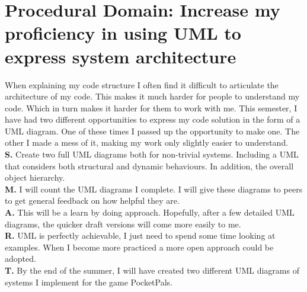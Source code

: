 \documentclass{scrartcl}
\begin{document}
\section{Procedural Domain: Increase my proficiency in using UML to express system architecture}
When explaining my code structure I often find it difficult to articulate the architecture of my code. This makes it much harder for people to understand my code. Which in turn makes it harder for them to work with me. 
This semester, I have had two different opportunities to express my code solution in the form of a UML diagram. One of these times I  passed up the opportunity to make one. The other I made a mess of it, making my work only
slightly easier to understand.\\
\textbf{S.} Create two full UML diagrams both for non-trivial systems. Including a UML that considers both structural and dynamic behaviours. In addition, the overall object hierarchy. \\
\textbf{M.} I will count the UML diagrams I complete. I will give these diagrams to peers to get general feedback on how helpful they are.\\
\textbf{A.} This will be a learn by doing approach. Hopefully, after a few detailed UML diagrams, the quicker draft versions will come more easily to me.\\
\textbf{R.}  UML is perfectly achievable, I just need to spend some time looking at examples. When I become more practiced a more open approach could be adopted.\\
\textbf{T.}  By the end of the summer, I will have created two different UML diagrams of systems I implement for the game PocketPals.\\




\end{document}
